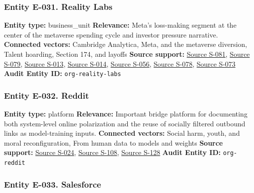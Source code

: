 \documentclass[
  american,
  11pt,
  letterpaper,
]{article}
\begin{document}
\subsubsection{Entity E-031. Reality
Labs}\label{entity-e-031-reality-labs}

\textbf{Entity type:} business\_unit \textbf{Relevance:} Meta's
loss-making segment at the center of the metaverse spending cycle and
investor pressure narrative. \textbf{Connected vectors:} Cambridge
Analytica, Meta, and the metaverse diversion, Talent hoarding, Section
174, and layoffs \textbf{Source support:}
\hyperref[source-s-081-the-facebook-company-is-now-meta]{Source S-081},
\hyperref[source-s-079-meta-platforms-inc-2023-annual-report-form-10-k]{Source
S-079},
\hyperref[source-s-013-meta-posts-lower-q4-profit-announces-huge-stock-buyback]{Source
S-013},
\hyperref[source-s-014-meta-posts-sharp-profit-revenue-increase-in-q4-thanks-to-cost-cuts-and-advertising-rebound]{Source
S-014},
\hyperref[source-s-056-meta-sees-ai-spending-accelerating-as-earnings-top-forecasts]{Source
S-056},
\hyperref[source-s-078-with-reality-labs-meta-risks-heading-down-slippery-slope-of-overspending-again]{Source
S-078},
\hyperref[source-s-073-meta-slashes-prices-for-vr-headsets]{Source
S-073} \textbf{Audit Entity ID:} \texttt{org-reality-labs}

\subsubsection{Entity E-032. Reddit}\label{entity-e-032-reddit}

\textbf{Entity type:} platform \textbf{Relevance:} Important bridge
platform for documenting both system-level online polarization and the
reuse of socially filtered outbound links as model-training inputs.
\textbf{Connected vectors:} Social harm, youth, and moral
reconfiguration, From human data to models and weights \textbf{Source
support:}
\hyperref[source-s-024-reddit-strikes-60m-deal-allowing-google-to-train-ai-models-on-its-posts-unveils-ipo-plans]{Source
S-024},
\hyperref[source-s-108-language-models-are-unsupervised-multitask-learners]{Source
S-108},
\hyperref[source-s-128-quantifying-social-organization-and-political-polarization-in-online-platforms]{Source
S-128} \textbf{Audit Entity ID:} \texttt{org-reddit}

\subsubsection{Entity E-033. Salesforce}\label{entity-e-033-salesforce}
\end{document}
